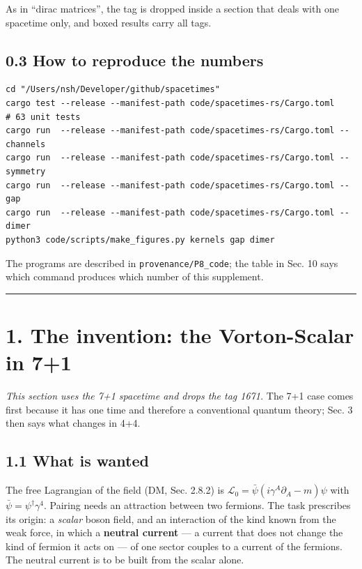 \documentclass[
  10pt,
]{article}
\begin{document}
As in ``dirac matrices'', the tag is dropped inside a section that deals
with one spacetime only, and boxed results carry all tags.

\hypertarget{how-to-reproduce-the-numbers}{%
\subsection{0.3 How to reproduce the
numbers}\label{how-to-reproduce-the-numbers}}

\begin{verbatim}
cd "/Users/nsh/Developer/github/spacetimes"
cargo test --release --manifest-path code/spacetimes-rs/Cargo.toml     # 63 unit tests
cargo run  --release --manifest-path code/spacetimes-rs/Cargo.toml -- channels
cargo run  --release --manifest-path code/spacetimes-rs/Cargo.toml -- symmetry
cargo run  --release --manifest-path code/spacetimes-rs/Cargo.toml -- gap
cargo run  --release --manifest-path code/spacetimes-rs/Cargo.toml -- dimer
python3 code/scripts/make_figures.py kernels gap dimer
\end{verbatim}

The programs are described in \texttt{provenance/P8\_code}; the table in
Sec. 10 says which command produces which number of this supplement.

\begin{center}\rule{0.5\linewidth}{0.5pt}\end{center}

\hypertarget{the-invention-the-vorton-scalar-in-71}{%
\section{1. The invention: the Vorton-Scalar in
7+1}\label{the-invention-the-vorton-scalar-in-71}}

\emph{This section uses the 7+1 spacetime and drops the tag 1671.} The
7+1 case comes first because it has one time and therefore a
conventional quantum theory; Sec. 3 then says what changes in 4+4.

\hypertarget{what-is-wanted}{%
\subsection{1.1 What is wanted}\label{what-is-wanted}}

The free Lagrangian of the field (DM, Sec. 2.8.2) is
\(\mathcal L_0=\bar\psi(i\gamma^A\partial_A-m)\psi\) with
\(\bar\psi=\psi^\dagger\gamma^4\). Pairing needs an attraction between
two fermions. The task prescribes its origin: a \emph{scalar} boson
field, and an interaction of the kind known from the weak force, in
which a \textbf{neutral current} --- a current that does not change the
kind of fermion it acts on --- of one sector couples to a current of the
fermions. The neutral current is to be built from the scalar alone.
\end{document}
